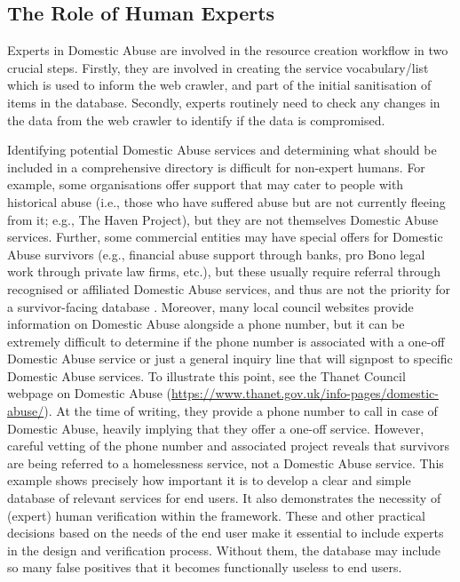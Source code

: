 \documentclass[conference]{IEEEtran}
\begin{document}
\subsection{The Role of Human Experts}
\label{sec:verif}
Experts in Domestic Abuse are involved in the resource creation workflow in two crucial steps.
Firstly, they are involved in creating the service vocabulary/list which is used to inform the web crawler, and part of the initial sanitisation of items in the database.
Secondly, experts routinely need to check any changes in the data from the web crawler to identify if the data is compromised.

Identifying potential Domestic Abuse services and determining what should be included in a comprehensive directory is difficult for non-expert humans. 
For example, some organisations offer support that may cater to people with historical abuse (i.e., those who have suffered abuse but are not currently fleeing from it; e.g., The Haven Project\cite{haven}), but they are not themselves Domestic Abuse services.
Further, some commercial entities may have special offers for Domestic Abuse survivors (e.g., financial abuse support through banks, pro Bono legal work through private law firms, etc.), but these usually require referral through recognised or affiliated Domestic Abuse services, and thus are not the priority for a survivor-facing database \cite{enduser}.  
Moreover, many local council websites provide information on Domestic Abuse alongside a phone number, but it can be extremely difficult to determine if the phone number is associated with a one-off Domestic Abuse service or just a general inquiry line that will signpost to specific Domestic Abuse services. 
To illustrate this point, see the Thanet Council webpage on Domestic Abuse (\url{https://www.thanet.gov.uk/info-pages/domestic-abuse/}). 
At the time of writing, they provide a phone number to call in case of Domestic Abuse, heavily implying that they offer a one-off service. 
However, careful vetting of the phone number and associated project reveals that survivors are being referred to a homelessness service, not a Domestic Abuse service. 
This example shows precisely how important it is to develop a clear and simple database of relevant services for end users. 
It also demonstrates the necessity of (expert) human verification within the framework.
These and other practical decisions based on the needs of the end user make it essential to include experts in the design and verification process. Without them, the database may include so many false positives that it becomes functionally useless to end users.
\end{document}

